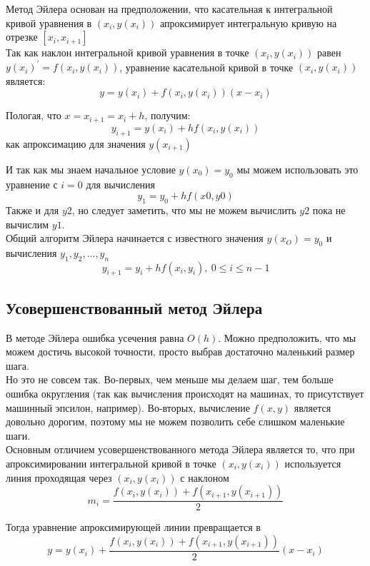 \documentclass[11pt, english]{article}
\begin{document}
    Метод Эйлера основан на предположении, что касательная к интегральной кривой уравнения в $(x_i, y(x_i))$ апроксимирует интегральную кривую на отрезке $[x_i, x_{i+1}]$\\

    Так как наклон интегральной кривой уравнения в точке $(x_i, y(x_i))$ равен $y(x_i)^{'} = f(x_i, y(x_i))$, уравнение касательной кривой в точке $(x_i, y(x_i))$ является:
    $$y = y(x_i) + f(x_i, y(x_i))(x - x_i)$$

    Пологая, что $x = x_{i + 1} = x_i + h$, получим:
    $$y_{i + 1} = y(x_i) + hf(x_i, y(x_i))$$
    как апроксимацию для значения $y(x_{i + 1})$

    И так как мы знаем начальное условие $y(x_0) = y_0$ мы можем использовать это уравнение с $i = 0$ для вычисления
    $$y_1 = y_0 + hf(x0, y0)$$
    Также и для $y2$, но следует заметить, что мы не можем вычислить $y2$ пока не вычислим $y1$. \\

    Общий алгоритм Эйлера начинается с известного значения $y(x_O) = y_0$ и вычисления $y_1, y_2, ... , y_n$
    $$y_{i+1} = y_i + hf(x_i, y_i),\: 0 \leq i \leq n - 1$$

    \subsection{Усовершенствованный метод Эйлера}

    В методе Эйлера ошибка усечения равна $O(h)$.
    Можно предположить, что мы можем достичь высокой точности, просто выбрав достаточно маленький размер шага. \\

    Но это не совсем так. Во-первых, чем меньше мы делаем шаг, тем больше ошибка округления (так как вычисления происходят на машинах, то присутствует машинный эпсилон, например). Во-вторых, вычисление $f(x,y)$ является довольно дорогим, поэтому мы не можем позволить себе слишком маленькие шаги. \\

    Основным отличием усовершенствованного метода Эйлера является то, что при апроксимировании интегральной кривой в точке $(x_i, y(x_i))$ используется линия проходящая через $(x_i, y(x_i))$ с наклоном
    $$m_i = \frac{f(x_i, y(x_i)) + f(x_{i+1}, y(x_{i+1}))}{2}$$

    Тогда уравнение апроксимирующей линии превращается в
    $$y = y(x_i) + \frac{f(x_i, y(x_i)) + f(x_{i+1}, y(x_{i+1}))}{2} (x - x_i)$$
\end{document}
